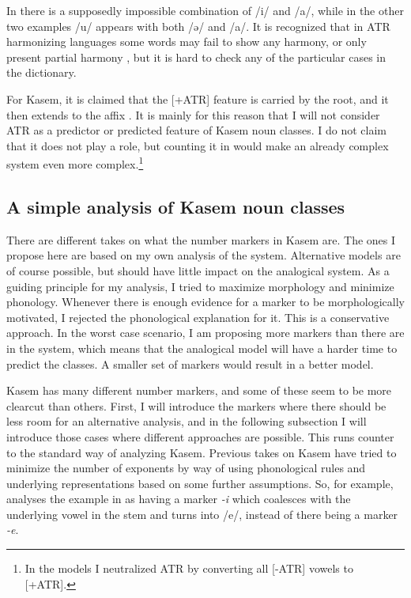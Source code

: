 In  there is a supposedly impossible combination of /i/ and /a/, while in the other two examples /u/ appears with both /ə/ and /a/. It is recognized that in ATR harmonizing languages some words may fail to show any harmony, or only present partial harmony \autocite{Casali.2008}, but it is hard to check any of the particular cases in the dictionary.

For Kasem, it is claimed that the [+ATR] feature is carried by the root, and it then extends to the affix \autocite[501]{Casali.2008}. It is mainly for this reason that I will not consider ATR as a predictor or predicted feature of Kasem noun classes. I do not claim that it does not play a role, but counting it in would make an already complex system even more complex.\footnote{In the models I neutralized ATR by converting all [-ATR] vowels to [+ATR].}

\subsection{A simple analysis of Kasem noun classes}

There are different takes on what the number markers in Kasem are. The ones I propose here are based on my own analysis of the system. Alternative models are of course possible, but should have little impact on the analogical system. As a guiding principle for my analysis, I tried to maximize morphology and minimize phonology. Whenever there is enough evidence for a marker to be morphologically motivated, I rejected the phonological explanation for it. This is a conservative approach. In the worst case scenario, I am proposing more markers than there are in the system, which means that the analogical model will have a harder time to predict the classes. A smaller set of markers would result in a better model. %

Kasem has many different number markers, and some of these seem to be more clearcut than others. First, I will introduce the markers where there should be less room for an alternative analysis, and in the following subsection I will introduce those cases where different approaches are possible. This runs counter to the standard way of analyzing Kasem. Previous takes on Kasem have tried to minimize the number of exponents by way of using phonological rules and underlying representations based on some further assumptions. So, for example, \textcite[184]{deHaas.1987} analyses the example in  as having a marker \textit{-i} which coalesces with the underlying vowel in the stem and turns into /e/, instead of there being a marker \textit{-e}.

